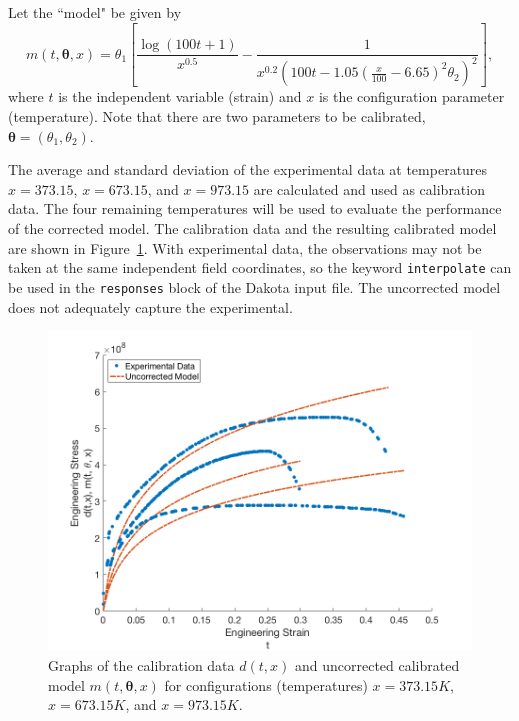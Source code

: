 Let the ``model" be given by
\begin{equation}
m(t, \boldsymbol{\theta}, x) = \theta_{1} \left[ \frac{\log(100t + 1)}{x^0.5}
  - \frac{1}{x^{0.2}\left(100t - 1.05\left(\frac{x}{100} - 6.65\right)^{2}
\theta_{2}\right)^{2}} \right],
\end{equation}
where $t$ is the independent variable (strain) and $x$ is the configuration 
parameter (temperature). Note that there are two parameters to be calibrated,
$\boldsymbol{\theta} = (\theta_{1}, \theta_{2})$. 

The average and standard deviation of the experimental data at temperatures 
$x = 373.15$, $x = 673.15$, and $x = 973.15$ are calculated and used as
calibration data. The four remaining temperatures
will be used to evaluate the performance of the corrected model. The 
calibration data and the resulting calibrated model are shown in 
Figure~\ref{fig:mat_uncorr}. With experimental data, the observations may not 
be taken at the same independent field coordinates, so the keyword 
\texttt{interpolate} can be used in the \texttt{responses} block of the Dakota 
input file. The uncorrected model does not adequately capture the experimental.

\begin{figure}[b!]
\begin{center}
\includegraphics[width=.6\textwidth]{images/moddiscrep_ExpUncorr.png}
\end{center}
\vspace{-0.5cm}
\caption{Graphs of the calibration data $d(t,x)$ and uncorrected calibrated
  model $m(t, \boldsymbol{\theta}, x)$ for configurations (temperatures) $x = 
373.15K$, $x = 673.15K$, and $x = 973.15K$.}
\label{fig:mat_uncorr}
\end{figure}

